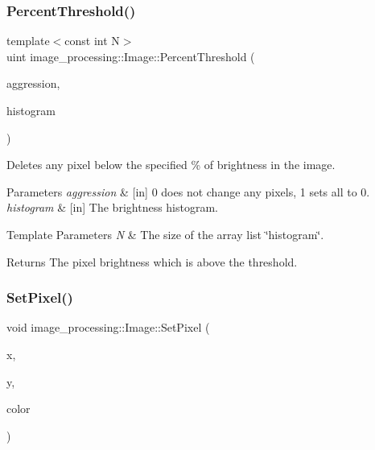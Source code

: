 \subsubsection{\texorpdfstring{Percent\+Threshold()}{PercentThreshold()}}
{\footnotesize\ttfamily template$<$const int N$>$ \\
uint image\+\_\+processing\+::\+Image\+::\+Percent\+Threshold (\begin{DoxyParamCaption}\item[{decimal}]{aggression,  }\item[{\hyperlink{classutil_1_1ArrayList}{Array\+List}$<$ uint, N $>$ \&}]{histogram }\end{DoxyParamCaption})\hspace{0.3cm}{\ttfamily [inline]}}



Deletes any pixel below the specified \% of brightness in the image. 


\begin{DoxyParams}{Parameters}
{\em aggression} & \mbox{[}in\mbox{]} 0 does not change any pixels, 1 sets all to 0. \\
\hline
{\em histogram} & \mbox{[}in\mbox{]} The brightness histogram. \\
\hline
\end{DoxyParams}

\begin{DoxyTemplParams}{Template Parameters}
{\em N} & The size of the array list \char`\"{}histogram\char`\"{}.\\
\hline
\end{DoxyTemplParams}
\begin{DoxyReturn}{Returns}
The pixel brightness which is above the threshold. 
\end{DoxyReturn}
\mbox{\label{classimage__processing_1_1Image_a8686d6979e34ca0afc35d3e0e241e8b6}} 
\subsubsection{\texorpdfstring{Set\+Pixel()}{SetPixel()}}
{\footnotesize\ttfamily void image\+\_\+processing\+::\+Image\+::\+Set\+Pixel (\begin{DoxyParamCaption}\item[{uint}]{x,  }\item[{uint}]{y,  }\item[{byte}]{color }\end{DoxyParamCaption})}



